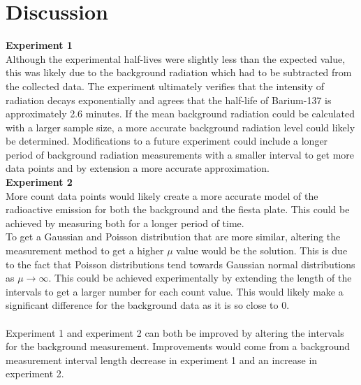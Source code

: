 \documentclass[
	letterpaper, %
	10pt, %
]{CSUniSchoolLabReport}
\begin{document}
\section{Discussion}
\vspace{20pt}
{\Large\textbf{Experiment 1}}\\

Although the experimental half-lives were slightly less than the expected value, this was likely due to the
background radiation which had to be subtracted from the collected data. The experiment ultimately
verifies that the intensity of radiation decays exponentially and agrees that the half-life of Barium-137 is
approximately 2.6 minutes. If the mean background radiation could be calculated with a larger sample size, a more
accurate background radiation level could likely be determined. Modifications to a future experiment could
include a longer period of background radiation measurements with a smaller interval to get more data points
and by extension a more accurate approximation.\\

{\Large\textbf{Experiment 2}}\\

More count data points would likely create a more accurate model of the radioactive emission for both
the background and the fiesta plate. This could be achieved by measuring both for a longer period of time.\\

To get a Gaussian and Poisson distribution that are more similar, altering the measurement method to get
a higher $\mu$ value would be the solution. This is due to the fact that Poisson distributions tend towards Gaussian
normal distributions as $\mu\rightarrow \infty$. This could be achieved experimentally by extending the length of the
intervals to get a larger number for each count value. This would likely make a significant difference for the
background data as it is so close to $0$.\\\\

Experiment 1 and experiment 2 can both be improved by altering the intervals for the background measurement. Improvements would come from a background measurement interval length decrease in experiment 1 and an increase in experiment 2.
\vspace{20pt}
\end{document}
